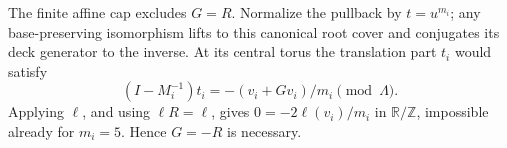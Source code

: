 \item The finite affine cap excludes $G=R$.  Normalize the pullback by
$t=u^{m_i}$; any base-preserving isomorphism lifts to this canonical
root cover and conjugates its deck generator to the inverse.
At its central torus the translation part $t_i$ would satisfy
\[
(I-M_i^{-1})t_i=-(v_i+Gv_i)/m_i\pmod\Lambda.
\]
Applying $\ell$, and using $\ell R=\ell$, gives
$0=-2\ell(v_i)/m_i$ in $\mathbb R/\mathbb Z$, impossible already
for $m_i=5$.  Hence $G=-R$ is necessary.

